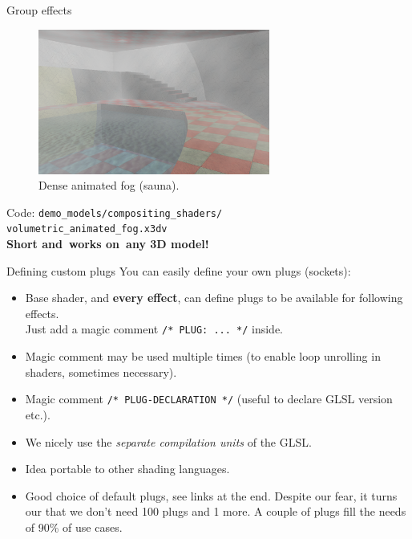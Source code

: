 \documentclass{beamer}
\begin{document}
\begin{frame}{Group effects}

\begin{figure}
  \centering
  \includegraphics[width=3in]{../volumetric_animated_fog_all}
  \caption{Dense animated fog (sauna).}
\end{figure}

Code: \texttt{demo\_models/compositing\_shaders/\\volumetric\_animated\_fog.x3dv}\\
\textbf{Short and~works on~any 3D model!}


\end{frame}

\begin{frame}{Defining custom plugs}
You can easily define your own plugs (sockets):
\begin{itemize}
  \item Base shader, and \textbf{every effect}, can define plugs
    to be available for following effects.\\
    Just add a magic comment \texttt{/* PLUG: ... */} inside.
  \item Magic comment may be used multiple times (to enable loop
    unrolling in shaders, sometimes necessary).
  \item Magic comment \texttt{/* PLUG-DECLARATION */}
    (useful to declare GLSL version etc.).
  \item We nicely use the \textit{separate compilation units} of the GLSL.
  \item Idea portable to other shading languages.
  \item Good choice of default plugs, see links at the end.
    Despite our fear, it turns our that we don't need 100 plugs
    and 1 more. A couple of plugs fill the needs of 90\% of use cases.
\end{itemize}
\end{frame}
\end{document}
